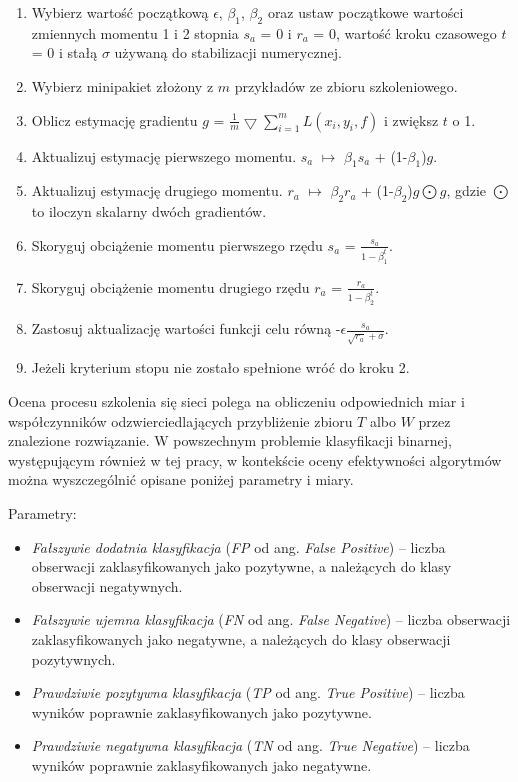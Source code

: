 \begin{enumerate}
	\item Wybierz wartość początkową $\epsilon$, $\beta_1$, $\beta_2$ oraz ustaw początkowe wartości zmiennych momentu 1 i 2 stopnia $s_a$ = 0 i $r_a$ = 0, wartość kroku czasowego $t$ = 0 \linebreak i stałą $\sigma$ używaną do stabilizacji numerycznej.
	\item Wybierz minipakiet złożony z $m$ przykładów ze zbioru szkoleniowego.
	\item Oblicz estymację gradientu $g$ = $\frac{1}{m}\bigtriangledown \sum_{i=1}^{m}L(x_i, y_i, f)$ i zwiększ $t$ o 1.
	\item Aktualizuj estymację pierwszego momentu. $s_a$ $\mapsto$ $\beta_1$$s_a$ + (1-$\beta_1$)$g$.
	\item Aktualizuj estymację drugiego momentu. $r_a$ $\mapsto$ $\beta_2$$r_a$ + (1-$\beta_2$)$g\bigodot g$, gdzie $\bigodot$ to iloczyn skalarny dwóch gradientów.
	\item Skoryguj obciążenie momentu pierwszego rzędu $s_a$ = $\frac{s_a}{1-\beta_1^t}$.
	\item Skoryguj obciążenie momentu drugiego rzędu $r_a$ = $\frac{r_a}{1-\beta_2^t}$.
	\item Zastosuj aktualizację wartości funkcji celu równą -$\epsilon$$\frac{s_a}{\sqrt{r_a}+\sigma}$.
	\item Jeżeli kryterium stopu nie zostało spełnione wróć do kroku 2. 
\end{enumerate}

Ocena procesu szkolenia się sieci polega na obliczeniu odpowiednich miar i współczynników odzwierciedlających przybliżenie zbioru $T$ albo $W$ przez znalezione rozwiązanie. W powszechnym problemie klasyfikacji binarnej, występującym również \linebreak w tej pracy, w kontekście oceny efektywności algorytmów można wyszczególnić opisane poniżej parametry i miary.

Parametry:
\begin{itemize}[noitemsep,nolistsep]
	\item \textit{Fałszywie dodatnia klasyfikacja} (\textit{FP} od ang. \textit{False Positive}) -- liczba obserwacji zaklasyfikowanych jako pozytywne, a należących do klasy obserwacji negatywnych.
	\item \textit{Fałszywie ujemna klasyfikacja} (\textit{FN} od ang. \textit{False Negative}) -- liczba obserwacji zaklasyfikowanych jako negatywne, a należących do klasy obserwacji pozytywnych. 
	\item \textit{Prawdziwie pozytywna klasyfikacja} (\textit{TP} od ang. \textit{True Positive}) -- liczba wyników poprawnie zaklasyfikowanych jako pozytywne. 
	\item \textit{Prawdziwie negatywna klasyfikacja} (\textit{TN} od ang. \textit{True Negative}) -- liczba wyników poprawnie zaklasyfikowanych jako negatywne.
\end{itemize}

